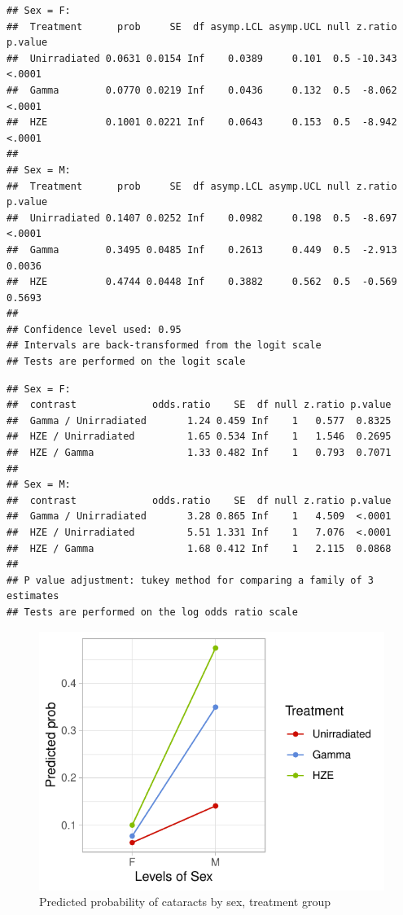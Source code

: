 \documentclass[12pt]{article}
\begin{document}
\begin{verbatim}
## Sex = F:
##  Treatment      prob     SE  df asymp.LCL asymp.UCL null z.ratio p.value
##  Unirradiated 0.0631 0.0154 Inf    0.0389     0.101  0.5 -10.343  <.0001
##  Gamma        0.0770 0.0219 Inf    0.0436     0.132  0.5  -8.062  <.0001
##  HZE          0.1001 0.0221 Inf    0.0643     0.153  0.5  -8.942  <.0001
## 
## Sex = M:
##  Treatment      prob     SE  df asymp.LCL asymp.UCL null z.ratio p.value
##  Unirradiated 0.1407 0.0252 Inf    0.0982     0.198  0.5  -8.697  <.0001
##  Gamma        0.3495 0.0485 Inf    0.2613     0.449  0.5  -2.913  0.0036
##  HZE          0.4744 0.0448 Inf    0.3882     0.562  0.5  -0.569  0.5693
## 
## Confidence level used: 0.95 
## Intervals are back-transformed from the logit scale 
## Tests are performed on the logit scale
\end{verbatim}

\begin{verbatim}
## Sex = F:
##  contrast             odds.ratio    SE  df null z.ratio p.value
##  Gamma / Unirradiated       1.24 0.459 Inf    1   0.577  0.8325
##  HZE / Unirradiated         1.65 0.534 Inf    1   1.546  0.2695
##  HZE / Gamma                1.33 0.482 Inf    1   0.793  0.7071
## 
## Sex = M:
##  contrast             odds.ratio    SE  df null z.ratio p.value
##  Gamma / Unirradiated       3.28 0.865 Inf    1   4.509  <.0001
##  HZE / Unirradiated         5.51 1.331 Inf    1   7.076  <.0001
##  HZE / Gamma                1.68 0.412 Inf    1   2.115  0.0868
## 
## P value adjustment: tukey method for comparing a family of 3 estimates 
## Tests are performed on the log odds ratio scale
\end{verbatim}

\begin{figure}[H]

\includegraphics{bookdown_report_files/figure-latex/contr-1} \hfill{}

\caption{Predicted probability of cataracts by sex, treatment group}\label{fig:contr}
\end{figure}
\end{document}
